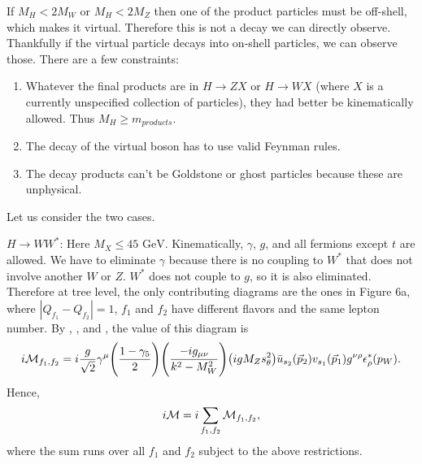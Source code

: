 If $M_H<2M_W$ or $M_H<2M_Z$ then one of the product particles must be
off-shell, which makes it virtual. Therefore this is not a decay we can
directly observe. Thankfully if the virtual particle decays into on-shell
particles, we can observe those. There are a few constraints:
\begin{enumerate}
  \item Whatever the final products are in $H\to ZX$ or $H\to WX$ (where $X$ is
        a currently unspecified collection of particles), they had better be
        kinematically allowed. Thus $M_H\geq m_{products}$.
  \item The decay of the virtual boson has to use valid Feynman rules.
  \item The decay products can't be Goldstone or ghost particles because these
        are unphysical.
\end{enumerate}
Let us consider the two cases.

\underline{$H\to WW^*$}: Here $M_X\leq\text{45~GeV}$. Kinematically, $\gamma$,
$g$, and all fermions except $t$ are allowed. We have to eliminate $\gamma$
because there is no coupling to $W^*$ that does not involve another $W$ or $Z$.
$W^*$ does not couple to $g$, so it is also eliminated. Therefore at tree level,
the only contributing diagrams are the ones in Figure 6a, where
$|Q_{f_1}-Q_{f_2}|=1$, $f_1$ and $f_2$ have different flavors and the same
lepton number. By , , and , the value of this diagram is
\begin{equation}
  i\mathcal{M}_{f_1,f_2}=i\frac{g}{\sqrt{2}}\gamma^\mu
    \Bigg(\frac{1-\gamma_5}{2}\Bigg)\Bigg(\frac{-ig_{\mu\nu}}{k^2-M_W^2}\Bigg)
       \big(igM_Zs_{\theta}^2\big)\bar{u}_{s_2}(\vec{p}_2)v_{s_1}(\vec{p}_1)
       g^{\nu\rho}\epsilon^*_\rho(p_W).
\end{equation}
Hence,
\begin{equation}
  i\mathcal{M}=i\sum\limits_{f_1,f_2}\mathcal{M}_{f_1,f_2},
\end{equation}
where the sum runs over all $f_1$ and $f_2$ subject to the above restrictions.

